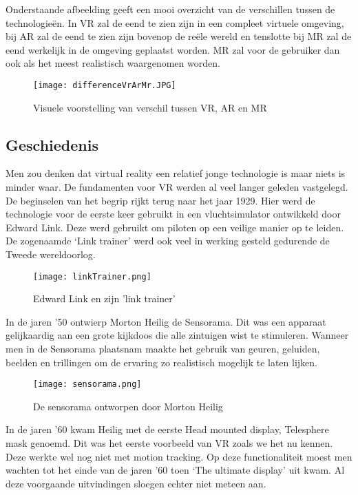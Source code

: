 Onderstaande afbeelding geeft een mooi overzicht van de verschillen tussen de technologieën. In VR zal de eend te zien zijn in een compleet virtuele omgeving, bij AR zal de eend te zien zijn bovenop de reële wereld en tenslotte bij MR zal de eend werkelijk in de omgeving geplaatst worden. MR zal voor de gebruiker dan ook als het meest realistisch waargenomen worden.

\begin{figure}[h]
	\centering
	\texttt{[image: differenceVrArMr.JPG]}
	\caption{Visuele voorstelling van verschil tussen VR, AR en MR}
\end{figure}

\subsection{Geschiedenis}

Men zou denken dat virtual reality een relatief jonge technologie is maar niets is minder waar. De fundamenten voor VR werden al veel langer geleden vastgelegd. De beginselen van het begrip rijkt terug naar het jaar 1929. Hier werd de technologie voor de eerste keer gebruikt in een vluchtsimulator ontwikkeld door Edward Link. Deze werd gebruikt om piloten op een veilige manier op te leiden. De zogenaamde ‘Link trainer’ werd ook veel in werking gesteld gedurende de Tweede wereldoorlog.

\begin{figure}[h]
	\centering
	\texttt{[image: linkTrainer.png]}
	\caption{Edward Link en zijn 'link trainer'}
\end{figure}

In de jaren ’50 ontwierp Morton Heilig de Sensorama. Dit was een apparaat gelijkaardig aan een grote kijkdoos die alle zintuigen wist te stimuleren. Wanneer men in de Sensorama plaatsnam maakte het gebruik van geuren, geluiden, beelden en trillingen om de ervaring zo realistisch mogelijk te laten lijken. 

\begin{figure}[h]
	\centering
	\texttt{[image: sensorama.png]}
	\caption{De sensorama ontworpen door Morton Heilig}
\end{figure}

In de jaren ’60 kwam Heilig met de eerste Head mounted display, Telesphere mask genoemd. Dit was het eerste voorbeeld van VR zoals we het nu kennen. Deze werkte wel nog niet met motion tracking.
Op deze functionaliteit moest men wachten tot het einde van de jaren ’60 toen ‘The ultimate display’ uit kwam.
Al deze voorgaande uitvindingen sloegen echter niet meteen aan.

